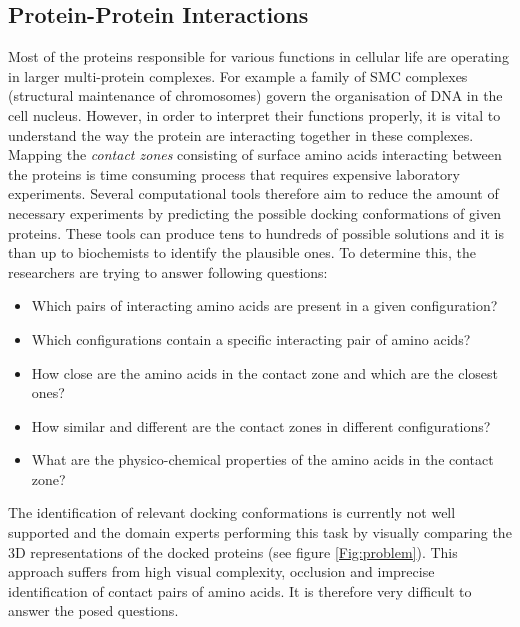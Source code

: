 \subsection{Protein-Protein Interactions}
Most of the proteins responsible for various functions in cellular life are operating in larger multi-protein complexes. For example a family of SMC complexes (structural maintenance of chromosomes) govern the organisation of DNA in the cell nucleus. However, in order to interpret their functions properly, it is vital to understand the way the protein are interacting together in these complexes. Mapping the \textit{contact zones} consisting of surface amino acids interacting between the proteins is time consuming process that requires expensive laboratory experiments. Several computational tools therefore aim to reduce the amount of necessary experiments by predicting the possible docking conformations of given proteins. These tools can produce tens to hundreds of possible solutions and it is than up to biochemists to identify the plausible ones. To determine this, the researchers are trying to answer following questions:

\begin{itemize}
\setlength\itemsep{0.5pt}
\item{Which pairs of interacting amino acids are present in a given configuration?}
\item{Which configurations contain a specific interacting pair of
amino acids?}
\item{How close are the amino acids in the contact zone and which
are the closest ones?}
\item{How similar and different are the contact zones in different configurations?}
\item{What are the physico-chemical properties of the amino acids
in the contact zone?}
\end{itemize}

The identification of relevant docking conformations is currently not well supported and the domain experts performing this task by visually comparing the 3D representations of the docked proteins (see figure \ref{Fig:problem}). This approach suffers from high visual complexity, occlusion and imprecise identification of contact pairs of amino acids. It is therefore very difficult to answer the posed questions.


